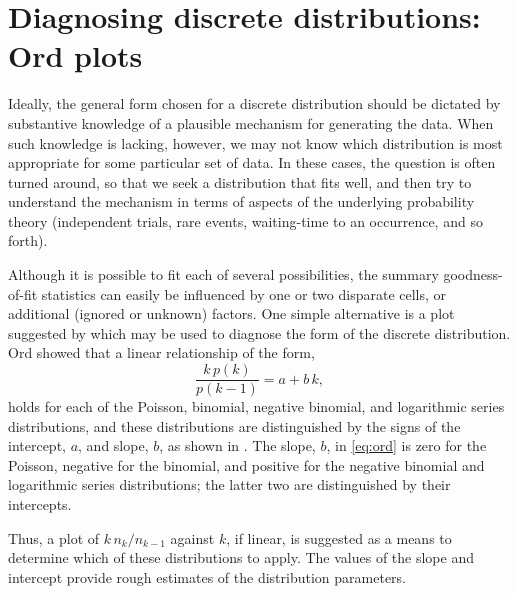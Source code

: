 \section{Diagnosing discrete distributions: Ord plots}%
\label{sec:discrete-Ord}
Ideally, the general form chosen for a discrete distribution should
be dictated by substantive knowledge of a plausible mechanism
for generating the data.
When such knowledge is lacking, however,
we may not know which distribution is most appropriate for
some particular set of data.
In these cases, the question is often turned around, so that we seek
a distribution that fits well, and then try to understand the mechanism
in terms of aspects of the underlying probability theory (independent trials,
rare events, waiting-time to an occurrence, and so forth).

Although it is possible to fit each of several possibilities,
the summary goodness-of-fit statistics can easily be influenced by
one or two disparate cells, or additional (ignored or unknown) factors.
One simple alternative is a plot suggested by
\citet{Ord:67} which may be used to diagnose
the form of the discrete distribution.  Ord showed that a linear
relationship of the form,
\begin{equation} \label{eq:ord}
  \frac{ k \,  p(k) } { p(k-1) }
 = a  +  b \,  k \comma
\end{equation}
holds for each of the Poisson, binomial, negative binomial, and
logarithmic series distributions, and these distributions are
distinguished by the signs of the intercept,
$a$, and slope, $b$, as shown in
.
The slope, \(b\),
in \eqref{eq:ord} is zero for the
Poisson, negative for the binomial, and positive for the negative
binomial and logarithmic series distributions; the latter two are
distinguished by their intercepts.

Thus, a plot of \(k \,  n_k /  n_{k-1}\) against \(k\), if linear,
is suggested as a means to determine which of these distributions to apply.
The values of the slope and intercept provide rough estimates of the
distribution parameters.

